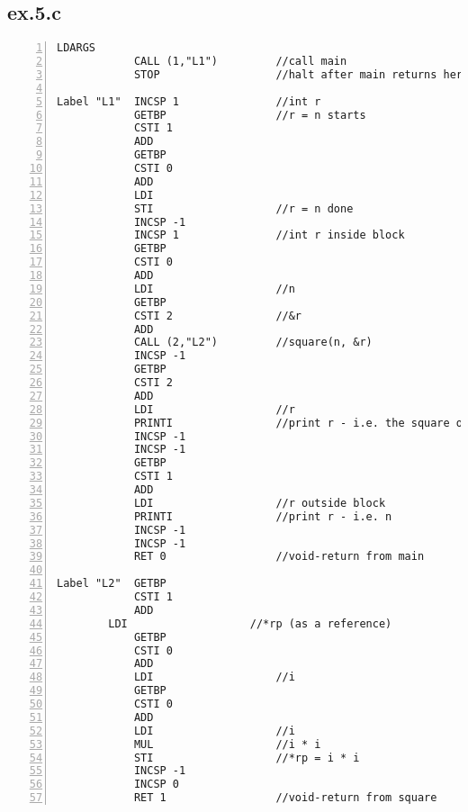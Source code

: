 \documentclass[a4paper, titlepage]{article}
\begin{document}
\subsection*{ex.5.c}
\begin{lstlisting}[numbers=left]
            LDARGS
            CALL (1,"L1")         //call main
            STOP                  //halt after main returns here

Label "L1"  INCSP 1               //int r
            GETBP                 //r = n starts
            CSTI 1
            ADD
            GETBP
            CSTI 0
            ADD
            LDI
            STI                   //r = n done
            INCSP -1
            INCSP 1               //int r inside block
            GETBP
            CSTI 0
            ADD
            LDI                   //n
            GETBP
            CSTI 2                //&r
            ADD
            CALL (2,"L2")         //square(n, &r)
            INCSP -1
            GETBP
            CSTI 2
            ADD
            LDI                   //r
            PRINTI                //print r - i.e. the square of n
            INCSP -1
            INCSP -1
            GETBP
            CSTI 1
            ADD
            LDI                   //r outside block
            PRINTI                //print r - i.e. n
            INCSP -1
            INCSP -1
            RET 0                 //void-return from main

Label "L2"  GETBP
            CSTI 1
            ADD
	    LDI                   //*rp (as a reference)
            GETBP
            CSTI 0
            ADD
            LDI                   //i
            GETBP
            CSTI 0
            ADD
            LDI                   //i
            MUL                   //i * i
            STI                   //*rp = i * i
            INCSP -1
            INCSP 0
            RET 1                 //void-return from square
\end{lstlisting}
\end{document}
